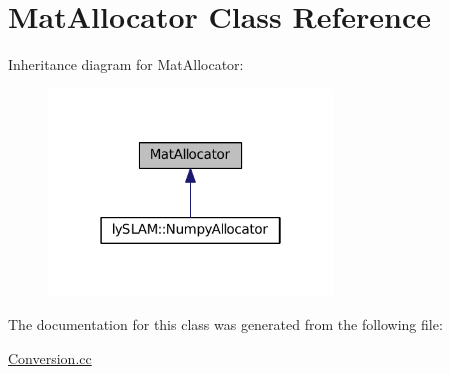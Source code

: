 \hypertarget{classMatAllocator}{}\section{Mat\+Allocator Class Reference}
\label{classMatAllocator}


Inheritance diagram for Mat\+Allocator\+:\nopagebreak
\begin{figure}[H]
\begin{center}
\leavevmode
\includegraphics[width=214pt]{classMatAllocator__inherit__graph}
\end{center}
\end{figure}


The documentation for this class was generated from the following file\+:\begin{DoxyCompactItemize}
\item 
\hyperlink{Conversion_8cc}{Conversion.\+cc}\end{DoxyCompactItemize}
